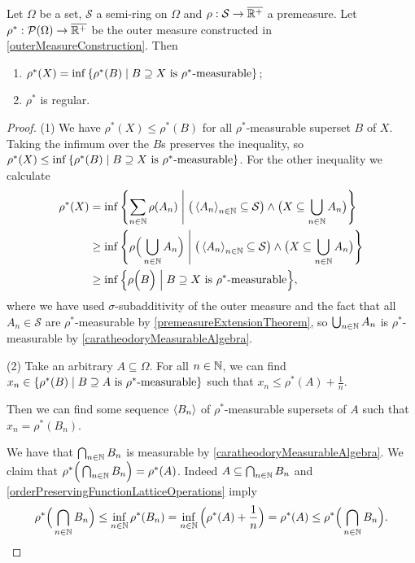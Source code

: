 \begin{proposition}
Let $\Omega$ be a set, $\mathcal{S}$ a semi-ring on $\Omega$ and $\rho: \mathcal{S}\to\overline{\mathbb{R}^+}$ a premeasure. Let $\rho^*:\operatorname{\mathcal{P}}(\Omega)\to \overline{\mathbb{R}^+}$ be the outer measure constructed in \ref{outerMeasureConstruction}. Then
\begin{enumerate}
\item $\rho^*(X) = \inf\setbuilder{\rho^*(B)}{\text{$B\supseteq X$ is $\rho^*$-measurable}}$;
\item $\rho^*$ is regular.
\end{enumerate}
\end{proposition}
\begin{proof}
(1) We have $\rho^*(X) \leq \rho^*(B)$ for all $\rho^*$-measurable superset $B$ of $X$. Taking the infimum over the $B$s preserves the inequality, so $\rho^*(X) \leq \inf\setbuilder{\rho^*(B)}{\text{$B\supseteq X$ is $\rho^*$-measurable}}$. For the other inequality we calculate
\begin{align*}
\rho^*(X) &= \inf\setbuilder{\sum_{n\in\N}\rho(A_n)}{\big(\seq{A_n}_{n\in\N}\subseteq \mathcal{S}\big) \land \big(X\subseteq \bigcup_{n\in\N}A_n\big)} \\
&\geq \inf\setbuilder{\rho\Big(\bigcup_{n\in \N}A_n\Big)}{\big(\seq{A_n}_{n\in\N}\subseteq \mathcal{S}\big) \land \big(X\subseteq \bigcup_{n\in\N}A_n\big)} \\
&\geq \inf\setbuilder{\rho\Big(B\Big)}{\text{$B\supseteq X$ is $\rho^*$-measurable}},
\end{align*}
where we have used $\sigma$-subadditivity of the outer measure and the fact that all $A_n\in \mathcal{S}$ are $\rho^*$-measurable by \ref{premeasureExtensionTheorem}, so $\bigcup_{n\in \mathbb{N}}A_n$ is $\rho^*$-measurable by \ref{caratheodoryMeasurableAlgebra}.

(2) Take an arbitrary $A\subseteq \Omega$. For all $n\in \mathbb{N}$, we can find $x_n\in \setbuilder{\rho^*(B)}{\text{$B\supseteq A$ is $\rho^*$-measurable}}$ such that $x_n \leq \rho^*(A) + \frac{1}{n}$. 

Then we can find some sequence $\left\langle B_n \right\rangle$ of $\rho^*$-measurable supersets of $A$ such that $x_n = \rho^*(B_n)$.

We have that $\bigcap_{n\in\mathbb{N}}B_n$ is measurable by \ref{caratheodoryMeasurableAlgebra}. We claim that $\rho^*\Big(\bigcap_{n\in\mathbb{N}}B_n\Big) = \rho^*(A)$. Indeed $A \subseteq \bigcap_{n\in\mathbb{N}}B_n$ and \ref{orderPreservingFunctionLatticeOperations} imply
\[ \rho^*\Big(\bigcap_{n\in\mathbb{N}}B_n\Big) \leq \inf_{n\in\mathbb{N}}\rho^*(B_n) = \inf_{n\in\mathbb{N}}\Big(\rho^*(A)+ \frac{1}{n}\Big) = \rho^*(A) \leq \rho^*\Big(\bigcap_{n\in\mathbb{N}}B_n\Big). \] 
\end{proof}
